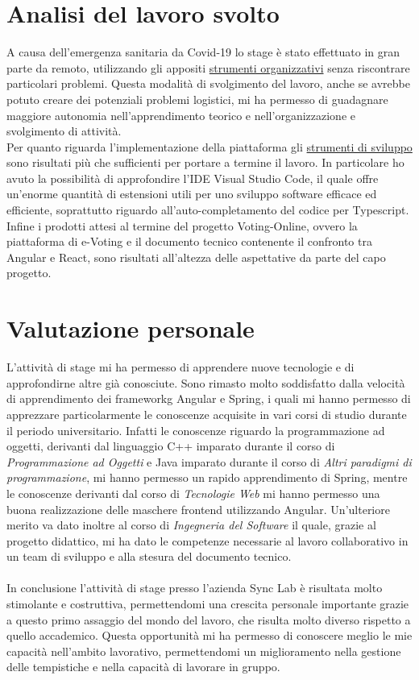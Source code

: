 \section{Analisi del lavoro svolto}
A causa dell'emergenza sanitaria da Covid-19 lo stage è stato effettuato in gran parte da remoto, utilizzando gli appositi \hyperref[sez:strumenti-organizzativi]{strumenti organizzativi} senza riscontrare particolari problemi. Questa modalità di svolgimento del lavoro, anche se avrebbe potuto creare dei potenziali problemi logistici, mi ha permesso di guadagnare maggiore autonomia nell'apprendimento teorico e nell'organizzazione e svolgimento di attività. \\
Per quanto riguarda l'implementazione della piattaforma gli \hyperref[sez:strumenti-smartworking]{strumenti di sviluppo} sono risultati più che sufficienti per portare a termine il lavoro. In particolare ho avuto la possibilità di approfondire l'IDE Visual Studio Code, il quale offre un'enorme quantità di estensioni utili per uno sviluppo software efficace ed efficiente, soprattutto riguardo all'auto-completamento del codice per Typescript. \\
Infine i prodotti attesi al termine del progetto Voting-Online, ovvero la piattaforma di e-Voting e il documento tecnico contenente il confronto tra Angular e React, sono risultati all'altezza delle aspettative da parte del capo progetto.

\section{Valutazione personale}
L'attività di stage mi ha permesso di apprendere nuove tecnologie e di approfondirne altre già conosciute. Sono rimasto molto soddisfatto dalla velocità di apprendimento dei \gls{frameworkg} Angular e Spring, i quali mi hanno permesso di apprezzare particolarmente le conoscenze acquisite in vari corsi di studio durante il periodo universitario. Infatti le conoscenze riguardo la programmazione ad oggetti, derivanti dal linguaggio C++ imparato durante il corso di \textit{Programmazione ad Oggetti} e Java imparato durante il corso di \textit{Altri paradigmi di programmazione}, mi hanno permesso un rapido apprendimento di Spring, mentre le conoscenze derivanti dal corso di \textit{Tecnologie Web} mi hanno permesso una buona realizzazione delle maschere \gls{frontend} utilizzando Angular. Un'ulteriore merito va dato inoltre al corso di \textit{Ingegneria del Software} il quale, grazie al progetto didattico, mi ha dato le competenze necessarie al lavoro collaborativo in un team di sviluppo e alla stesura del documento tecnico. \\ \\
In conclusione l'attività di stage presso l'azienda Sync Lab è risultata molto stimolante e costruttiva, permettendomi una crescita personale importante grazie a questo primo assaggio del mondo del lavoro, che risulta molto diverso rispetto a quello accademico. Questa opportunità mi ha permesso di conoscere meglio le mie capacità nell'ambito lavorativo, permettendomi un miglioramento nella gestione delle tempistiche e nella capacità di lavorare in gruppo.


